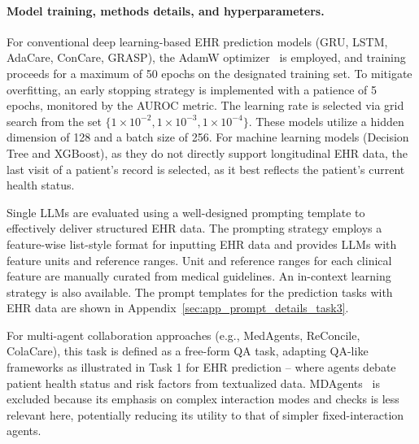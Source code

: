 \documentclass{article}
\begin{document}
\paragraph{Model training, methods details, and hyperparameters.}
\label{sec:app_task3_models_hyperparams}
For conventional deep learning-based EHR prediction models (GRU, LSTM, AdaCare, ConCare, GRASP), the AdamW optimizer~\cite{loshchilov2017decoupled} is employed, and training proceeds for a maximum of 50 epochs on the designated training set. To mitigate overfitting, an early stopping strategy is implemented with a patience of 5 epochs, monitored by the AUROC metric. The learning rate is selected via grid search from the set $\{1 \times 10^{-2}, 1 \times 10^{-3}, 1 \times 10^{-4}\}$. These models utilize a hidden dimension of 128 and a batch size of 256. For machine learning models (Decision Tree and XGBoost), as they do not directly support longitudinal EHR data, the last visit of a patient's record is selected, as it best reflects the patient's current health status.

Single LLMs are evaluated using a well-designed prompting template to effectively deliver structured EHR data. The prompting strategy employs a feature-wise list-style format for inputting EHR data and provides LLMs with feature units and reference ranges. Unit and reference ranges for each clinical feature are manually curated from medical guidelines. An in-context learning strategy is also available. The prompt templates for the prediction tasks with EHR data are shown in Appendix~\ref{sec:app_prompt_details_task3}.

For multi-agent collaboration approaches (e.g., MedAgents, ReConcile, ColaCare), this task is defined as a free-form QA task, adapting QA-like frameworks as illustrated in Task 1 for EHR prediction -- where agents debate patient health status and risk factors from textualized data. MDAgents~\cite{kim2024mdagents} is excluded because its emphasis on complex interaction modes and checks is less relevant here, potentially reducing its utility to that of simpler fixed-interaction agents.
\end{document}
